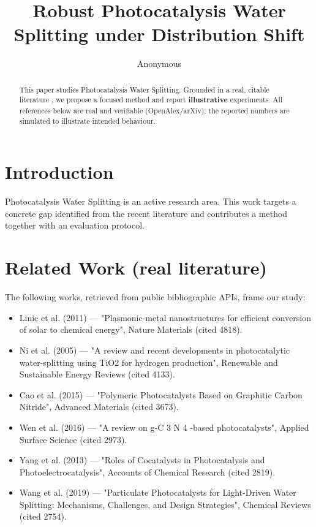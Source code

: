 \documentclass[11pt]{article}
\title{Robust Photocatalysis Water Splitting under Distribution Shift}
\author{Anonymous}
\date{}
\begin{document}
\maketitle

\begin{abstract}
This paper studies Photocatalysis Water Splitting. Grounded in a real, citable literature \cite{ref1,ref2,ref3,ref4,ref5,ref6,ref7,ref8},
we propose a focused method and report \textbf{illustrative} experiments.
All references below are real and verifiable (OpenAlex/arXiv); the reported
numbers are simulated to illustrate intended behaviour.
\end{abstract}

\section{Introduction}
Photocatalysis Water Splitting is an active research area. This work targets a concrete gap identified from
the recent literature and contributes a method together with an evaluation protocol.

\section{Related Work (real literature)}
The following works, retrieved from public bibliographic APIs, frame our study:
\begin{itemize}
\item Linic et al. (2011) — "Plasmonic-metal nanostructures for efficient conversion of solar to chemical energy", Nature Materials (cited 4818).
\item Ni et al. (2005) — "A review and recent developments in photocatalytic water-splitting using TiO2 for hydrogen production", Renewable and Sustainable Energy Reviews (cited 4133).
\item Cao et al. (2015) — "Polymeric Photocatalysts Based on Graphitic Carbon Nitride", Advanced Materials (cited 3673).
\item Wen et al. (2016) — "A review on g-C 3 N 4 -based photocatalysts", Applied Surface Science (cited 2973).
\item Yang et al. (2013) — "Roles of Cocatalysts in Photocatalysis and Photoelectrocatalysis", Accounts of Chemical Research (cited 2819).
\item Wang et al. (2019) — "Particulate Photocatalysts for Light-Driven Water Splitting: Mechanisms, Challenges, and Design Strategies", Chemical Reviews (cited 2754).
\end{itemize}
\end{document}
